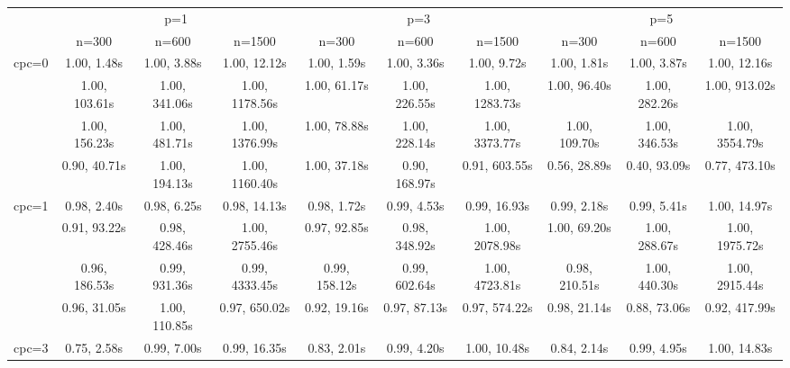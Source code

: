 \documentclass[article]{jss}\usepackage[]{graphicx}\usepackage[]{xcolor}
\begin{document}
\begin{landscape}

\begin{table}[t!]
  \centering
  \begin{tabular}{@{}cccccccccc@{}}
  \toprule
                          & \multicolumn{3}{c}{p=1}                                            & \multicolumn{3}{c}{p=3}                                            & \multicolumn{3}{c}{p=5}                                            \\
                          & n=300                & n=600                & n=1500               & n=300                & n=600                & n=1500               & n=300                & n=600                & n=1500               \\ \midrule
  \multirow{4}{*}{cpc=0} & 1.00, 1.48s & 1.00, 3.88s & 1.00, 12.12s & 1.00, 1.59s & 1.00, 3.36s & 1.00, 9.72s & 1.00, 1.81s & 1.00, 3.87s & 1.00, 12.16s \\
                          & 1.00, 103.61s & 1.00, 341.06s & 1.00, 1178.56s & 1.00, 61.17s & 1.00, 226.55s & 1.00, 1283.73s & 1.00, 96.40s & 1.00, 282.26s & 1.00, 913.02s \\
                          & 1.00, 156.23s & 1.00, 481.71s & 1.00, 1376.99s & 1.00, 78.88s & 1.00, 228.14s & 1.00, 3373.77s & 1.00, 109.70s & 1.00, 346.53s & 1.00, 3554.79s \\
                          & 0.90, 40.71s & 1.00, 194.13s & 1.00, 1160.40s & 1.00, 37.18s & 0.90, 168.97s & 0.91, 603.55s & 0.56, 28.89s & 0.40, 93.09s & 0.77, 473.10s \\ \midrule
  \multirow{4}{*}{cpc=1} & 0.98, 2.40s & 0.98, 6.25s & 0.98, 14.13s & 0.98, 1.72s & 0.99, 4.53s & 0.99, 16.93s & 0.99, 2.18s & 0.99, 5.41s & 1.00, 14.97s \\
                          & 0.91, 93.22s & 0.98, 428.46s & 1.00, 2755.46s & 0.97, 92.85s & 0.98, 348.92s & 1.00, 2078.98s & 1.00, 69.20s & 1.00, 288.67s & 1.00, 1975.72s \\
                          & 0.96, 186.53s & 0.99, 931.36s & 0.99, 4333.45s & 0.99, 158.12s & 0.99, 602.64s & 1.00, 4723.81s & 0.98, 210.51s & 1.00, 440.30s & 1.00, 2915.44s \\
                          & 0.96, 31.05s & 1.00, 110.85s & 0.97, 650.02s & 0.92, 19.16s & 0.97, 87.13s & 0.97, 574.22s & 0.98, 21.14s & 0.88, 73.06s & 0.92, 417.99s \\ \midrule
  \multirow{4}{*}{cpc=3} & 0.75, 2.58s & 0.99, 7.00s & 0.99, 16.35s & 0.83, 2.01s & 0.99, 4.20s & 1.00, 10.48s & 0.84, 2.14s & 0.99, 4.95s & 1.00, 14.83s \\

\end{tabular}
\end{table}
\end{landscape}
\end{document}

